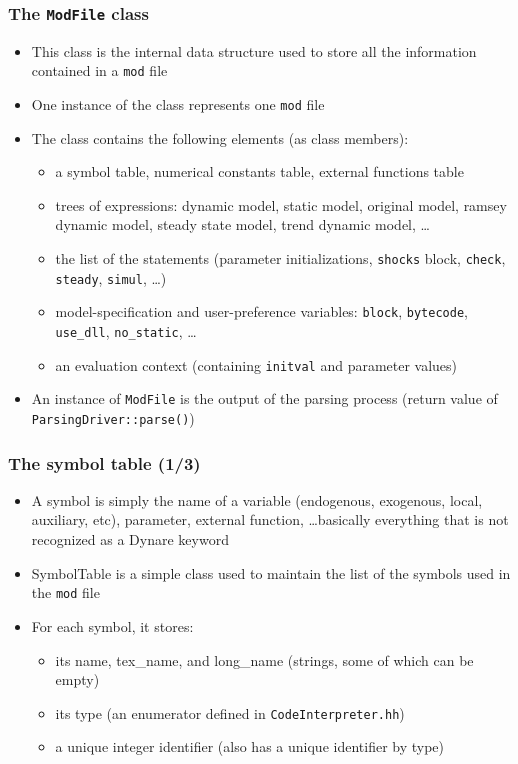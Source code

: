 \documentclass{beamer}
\begin{document}
\begin{frame}
  \frametitle{The \texttt{ModFile} class}
  \begin{itemize}
  \item This class is the internal data structure used to store all the information contained in a \texttt{mod} file
  \item One instance of the class represents one \texttt{mod} file
  \item The class contains the following elements (as class members):
    \begin{itemize}
    \item a symbol table, numerical constants table, external functions table
    \item trees of expressions: dynamic model, static model, original model, ramsey dynamic model, steady state model, trend dynamic model, \ldots
    \item the list of the statements (parameter initializations, \texttt{shocks} block, \texttt{check}, \texttt{steady}, \texttt{simul}, \ldots)
    \item model-specification and user-preference variables: \texttt{block}, \texttt{bytecode}, \texttt{use\_dll}, \texttt{no\_static}, \ldots
    \item an evaluation context (containing \texttt{initval} and parameter values)
    \end{itemize}
  \item An instance of \texttt{ModFile} is the output of the parsing process (return value of \texttt{ParsingDriver::parse()})
  \end{itemize}
\end{frame}

\begin{frame}
  \frametitle{The symbol table (1/3)}
  \begin{itemize}
  \item A \alert{symbol} is simply the name of a variable (endogenous, exogenous, local, auxiliary, etc), parameter, external function, \ldots basically everything that is not recognized as a Dynare keyword
  \item \alert{SymbolTable} is a simple class used to maintain the list of the symbols used in the \texttt{mod} file
  \item For each symbol, it stores:
    \begin{itemize}
    \item its name, tex\_name, and long\_name (strings, some of  which can be empty)
    \item its type (an enumerator defined in \texttt{CodeInterpreter.hh})
    \item a unique integer identifier (also has a unique identifier by type)
    \end{itemize}
  \end{itemize}
\end{frame}
\end{document}
